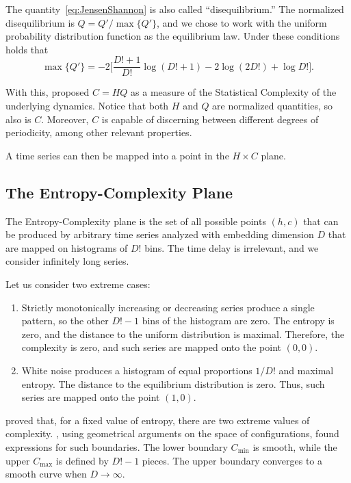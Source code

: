 \documentclass[alpha-refs]{wiley-article}
\begin{document}
The quantity~\eqref{eq:JensenShannon} is also called ``disequilibrium.''
The normalized disequilibrium is $ Q=Q'/\max\{Q'\}$, and we chose to work with the uniform probability distribution function as the equilibrium law.
Under these conditions holds that
$$
\max\{Q'\} = -2\Big[
\frac{D!+1}{D!} \log(D!+1) - 2 \log(2D!) + \log D!
\Big].
$$

With this, \citet{Lamberti2004} proposed $C=HQ$ as a measure of the Statistical Complexity of the underlying dynamics.
Notice that both $H$ and $Q$ are normalized quantities, so also is $C$. 
Moreover, $C$ is capable of discerning between different degrees of periodicity, among other relevant properties.

A time series can then be mapped into a point in the $H\times C$ plane.

\subsection{The Entropy-Complexity Plane}\label{Sec:HCPlane}

The Entropy-Complexity plane is the set of all possible points $(h,c)$ that can be produced by arbitrary time series analyzed with embedding dimension $D$ that are mapped on histograms of $D!$ bins.
The time delay is irrelevant, and we consider infinitely long series.

Let us consider two extreme cases:
\begin{enumerate}[label=Case~\Roman*., align=left, leftmargin=*]
	\item 	Strictly monotonically increasing or decreasing series produce a single pattern, so the other $D!-1$ bins of the histogram are zero. 
	The entropy is zero, and the distance to the uniform distribution is maximal. 
	Therefore, the complexity is zero, and such series are mapped onto the point $(0,0)$.
	\item 	White noise produces a histogram of equal proportions $1/D!$ and maximal entropy. 
	The distance to the equilibrium distribution is zero. 
	Thus, such series are mapped onto the point $(1,0)$.
\end{enumerate}

\citet{SomeFeaturesoftheLMCStatisticalComplexity} proved that, for a fixed value of entropy, there are two extreme values of complexity.
\citet{martin2006generalized}, using geometrical arguments on the space of configurations, found expressions for such boundaries.
The lower boundary $C_{\min}$ is smooth, while the upper $C_{\max}$ is defined by $D!-1$ pieces.
The upper boundary converges to a smooth curve when $D\to\infty$.
\end{document}
